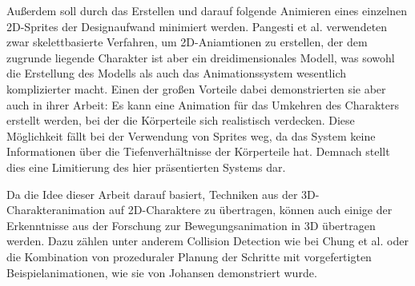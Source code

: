Außerdem soll durch das Erstellen und darauf folgende Animieren eines einzelnen 2D-Sprites der Designaufwand minimiert werden. Pangesti et al.\cite{pangesti2019analysis} verwendeten zwar skelettbasierte Verfahren, um 2D-Aniamtionen zu erstellen, der dem zugrunde liegende Charakter ist aber ein dreidimensionales Modell, was sowohl die Erstellung des Modells als auch das Animationssystem wesentlich komplizierter macht. Einen der großen Vorteile dabei demonstrierten sie aber auch in ihrer Arbeit: Es kann eine Animation für das Umkehren des Charakters erstellt werden, bei der die Körperteile sich realistisch verdecken. Diese Möglichkeit fällt bei der Verwendung von Sprites weg, da das System keine Informationen über die Tiefenverhältnisse der Körperteile hat. Demnach stellt dies eine Limitierung des hier präsentierten Systems dar.

Da die Idee dieser Arbeit darauf basiert, Techniken aus der 3D-Charakteranimation auf 2D-Charaktere zu übertragen, können auch einige der Erkenntnisse aus der Forschung zur Bewegungsanimation in 3D übertragen werden. Dazu zählen unter anderem Collision Detection wie bei Chung et al.\cite{chung1999animation} oder die Kombination von prozeduraler Planung der Schritte mit vorgefertigten Beispielanimationen, wie sie von Johansen\cite{johansen2009automated} demonstriert wurde.